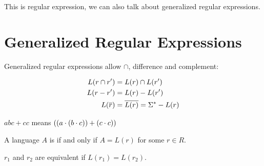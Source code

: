 \documentclass[11pt, cyan, night, 0.5in]{LatexTemplate/hw}
\begin{document}
This is regular expression, we can also talk about generalized regular expressions.

\section{Generalized Regular Expressions}

Generalized regular expressions allow $\cap$, difference and complement:

\begin{align*}
    L(r\cap r') &= L(r)\cap L(r')\\
    L(r-r') &= L(r) - L(r')\\
    L(\overline{r}) &= \overline{L(r)} = \Sigma^* - L(r)
\end{align*}

$abc+cc$ means $((a\cdot (b\cdot c)) + (c\cdot c))$

A language $A$ is \underline{} if and only if $A=L(r)$ for some $r\in R$.

$r_1$ and $r_2$ are equivalent if $L(r_1)=L(r_2)$.


\end{document}
